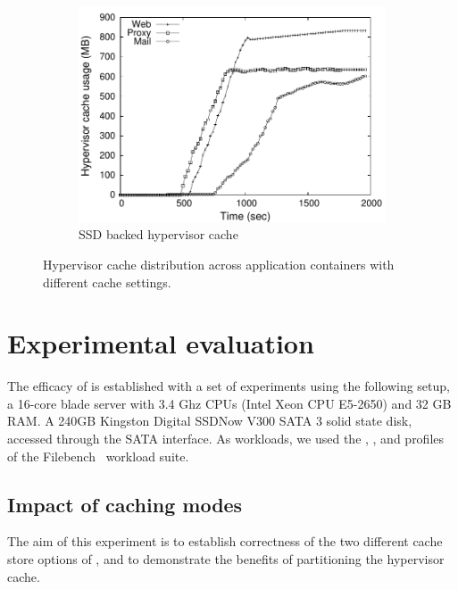 \begin{figure}[t]
\begin{subfigure}{0.38\textwidth}
\includegraphics[width=\textwidth]{data/correctness/musage_global_ssd_new} 
 \caption{\dd{} SSD backed hypervisor cache}
 \label{fig:ddeckerssd} 
\vspace{-0.2cm}
\end{subfigure} 
%
\caption{Hypervisor cache distribution across application containers with
         different cache settings.}
\vspace{-0.25cm}
\label{fig:expt1}
\end{figure}

\section{Experimental evaluation}
\label{sec:expt}

The efficacy of \dd{} is established with a set of experiments using the
following setup,
a 16-core blade server with 3.4 Ghz  CPUs (Intel Xeon CPU E5-2650)
and 32 GB RAM.
%
A 240GB Kingston Digital SSDNow V300 SATA 3 solid state disk, accessed
through the SATA interface.
%
As workloads, we used
the \web, \proxy, \mail{} and \video{} profiles of the 
Filebench~\cite{filebench} workload suite.
%  
%

\subsection{Impact of caching modes}
The aim of this experiment is to establish correctness of the
two different cache store options of \dd, and to demonstrate the
benefits of partitioning the hypervisor cache.

